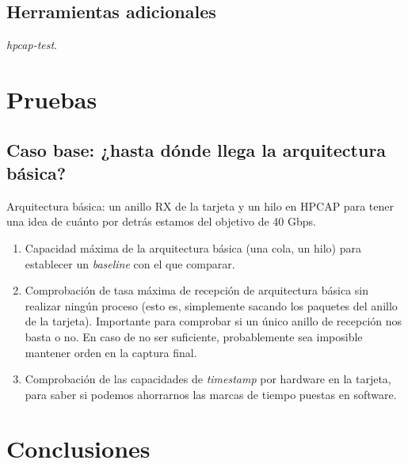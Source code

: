 \documentclass[oneside, draft]{epstfg}
\begin{document}
\section{Herramientas adicionales}

\textit{hpcap-test}.

\chapter{Pruebas}

\section{Caso base: ¿hasta dónde llega la arquitectura básica?}

Arquitectura básica: un anillo RX de la tarjeta y un hilo en HPCAP para tener una idea de cuánto por detrás estamos del objetivo de 40 Gbps.

\begin{enumerate}
\item Capacidad máxima de la arquitectura básica (una cola, un hilo) para establecer un \textit{baseline} con el que comparar.
\item Comprobación de tasa máxima de recepción de arquitectura básica sin realizar ningún proceso (esto es, simplemente sacando los paquetes del anillo de la tarjeta). Importante para comprobar si un único anillo de recepción nos basta o no. En caso de no ser suficiente, probablemente sea imposible mantener orden en la captura final.
\item Comprobación de las capacidades de \textit{timestamp} por hardware en la tarjeta, para saber si podemos ahorrarnos las marcas de tiempo puestas en software.
\end{enumerate}


\chapter{Conclusiones}

\appendix

\printnoidxglossaries
\cleardoublepage

\nocite{*}
{}

\cleardoublepage
\printindex
\end{document}
